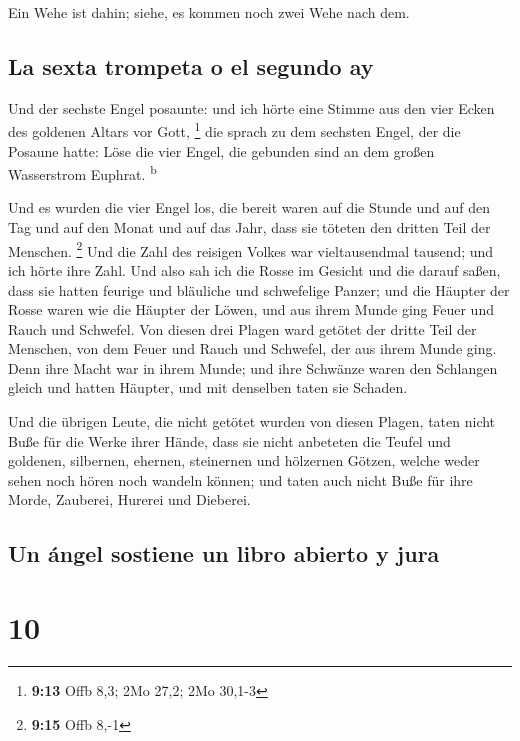  Ein Wehe ist dahin; siehe, es kommen noch zwei Wehe nach
dem.

\hypertarget{la-sexta-trompeta-o-el-segundo-ay}{%
\subsection{La sexta trompeta o el segundo
ay}\label{la-sexta-trompeta-o-el-segundo-ay}}

 Und der sechste Engel posaunte: und ich hörte eine
Stimme aus den vier Ecken des goldenen Altars vor Gott, \footnote{\textbf{9:13}
  Offb 8,3; 2Mo 27,2; 2Mo 30,1-3}  die sprach zu dem
sechsten Engel, der die Posaune hatte: Löse die vier Engel, die gebunden
sind an dem großen Wasserstrom Euphrat. \textsuperscript{b}

 Und es wurden die vier Engel los, die bereit waren auf
die Stunde und auf den Tag und auf den Monat und auf das Jahr, dass sie
töteten den dritten Teil der Menschen. \footnote{\textbf{9:15} Offb 8,-1}
 Und die Zahl des reisigen Volkes war vieltausendmal
tausend; und ich hörte ihre Zahl.  Und also sah ich die
Rosse im Gesicht und die darauf saßen, dass sie hatten feurige und
bläuliche und schwefelige Panzer; und die Häupter der Rosse waren wie
die Häupter der Löwen, und aus ihrem Munde ging Feuer und Rauch und
Schwefel.  Von diesen drei Plagen ward getötet der dritte
Teil der Menschen, von dem Feuer und Rauch und Schwefel, der aus ihrem
Munde ging.  Denn ihre Macht war in ihrem Munde; und ihre
Schwänze waren den Schlangen gleich und hatten Häupter, und mit
denselben taten sie Schaden.

 Und die übrigen Leute, die nicht getötet wurden von
diesen Plagen, taten nicht Buße für die Werke ihrer Hände, dass sie
nicht anbeteten die Teufel und goldenen, silbernen, ehernen, steinernen
und hölzernen Götzen, welche weder sehen noch hören noch wandeln können;
 und taten auch nicht Buße für ihre Morde, Zauberei,
Hurerei und Dieberei.

\hypertarget{un-uxe1ngel-sostiene-un-libro-abierto-y-jura}{%
\subsection{Un ángel sostiene un libro abierto y
jura}\label{un-uxe1ngel-sostiene-un-libro-abierto-y-jura}}

\hypertarget{section-9}{%
\section{10}\label{section-9}}

